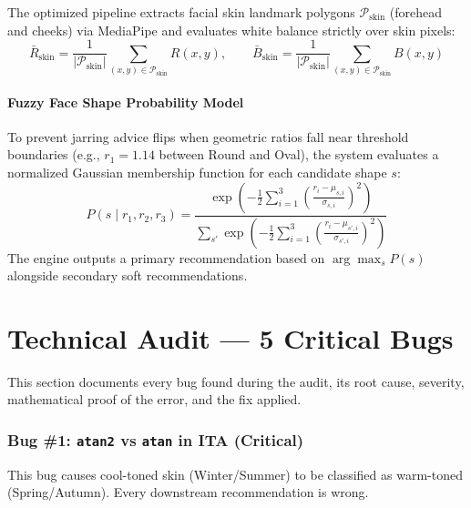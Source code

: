 \documentclass[12pt,a4paper]{article}
\begin{document}
The optimized pipeline extracts facial skin landmark polygons $\mathcal{P}_{\text{skin}}$ (forehead and cheeks) via MediaPipe and evaluates white balance strictly over skin pixels:
\begin{equation}
\bar{R}_{\text{skin}} = \frac{1}{|\mathcal{P}_{\text{skin}}|} \sum_{(x,y) \in \mathcal{P}_{\text{skin}}} R(x,y), \qquad \bar{B}_{\text{skin}} = \frac{1}{|\mathcal{P}_{\text{skin}}|} \sum_{(x,y) \in \mathcal{P}_{\text{skin}}} B(x,y)
\end{equation}

\subsection{Fuzzy Face Shape Probability Model}
To prevent jarring advice flips when geometric ratios fall near threshold boundaries (e.g., $r_1 = 1.14$ between Round and Oval), the system evaluates a normalized Gaussian membership function for each candidate shape $s$:
\begin{equation}
P(s \mid r_1, r_2, r_3) = \frac{\exp\left(-\frac{1}{2} \sum_{i=1}^3 \left(\frac{r_i - \mu_{s,i}}{\sigma_{s,i}}\right)^2\right)}{\sum_{s'} \exp\left(-\frac{1}{2} \sum_{i=1}^3 \left(\frac{r_i - \mu_{s',i}}{\sigma_{s',i}}\right)^2\right)}
\end{equation}
The engine outputs a primary recommendation based on $\arg\max_s P(s)$ alongside secondary soft recommendations.

\part{Technical Audit --- 5 Critical Bugs}
\label{sec:audit}

This section documents every bug found during the audit, its root cause, severity, mathematical proof of the error, and the fix applied.

\section{Bug \#1: \texttt{atan2} vs \texttt{atan} in ITA\textdegree{} (Critical)}
\label{sec:bug1}

\begin{dangerblock}
This bug causes cool-toned skin (Winter/Summer) to be classified as warm-toned (Spring/Autumn). Every downstream recommendation is wrong.
\end{dangerblock}
\end{document}
